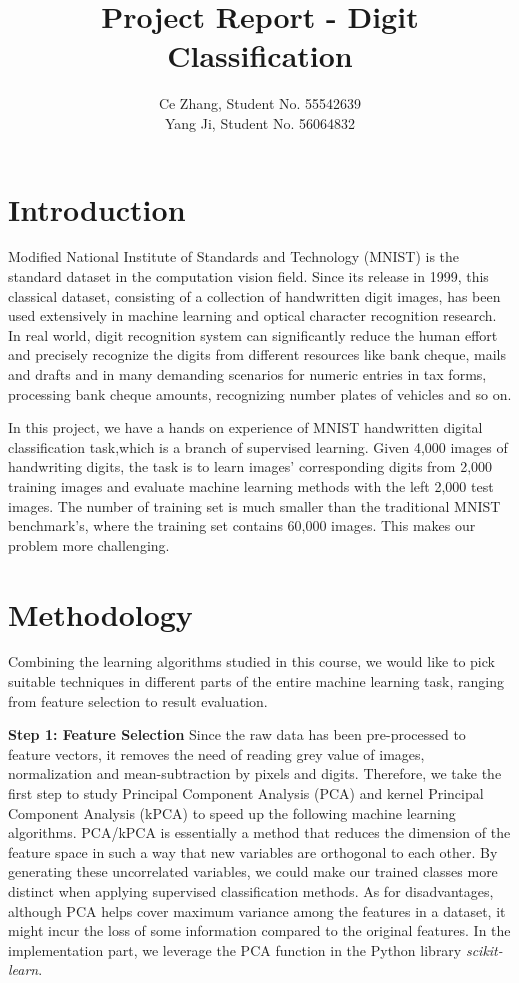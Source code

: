 \documentclass[12pt]{article}
\title{Project Report - Digit Classification}
\date{}
\author{\fontsize{12}{12}\selectfont Ce Zhang, Student No. 55542639\\
\fontsize{12}{12}\selectfont Yang Ji, Student No. 56064832}
\begin{document}
\maketitle
\section{\fontsize{12}{12}\selectfont Introduction}
Modified National Institute of Standards and Technology (MNIST) is the standard dataset in the computation vision field. Since its release in 1999, this classical dataset, consisting of a collection of handwritten digit images, has been used extensively in machine learning and optical character recognition research. In real world, digit recognition system can significantly reduce the human effort and precisely recognize the digits from different resources like bank cheque, mails and drafts and in many demanding scenarios for numeric entries in tax forms, processing bank cheque amounts, recognizing number plates of vehicles and so on. 

In this project, we have a hands on experience of MNIST handwritten digital classification task,which is a branch of supervised learning. Given 4,000 images of handwriting digits, the task is to learn images' corresponding digits from 2,000 training images and evaluate machine learning methods with the left 2,000 test images. The number of training set is much smaller than the traditional MNIST benchmark's, where the training set contains 60,000 images. This makes our problem more challenging.

\section{\fontsize{12}{12}\selectfont Methodology}
Combining the learning algorithms studied in this course, we would like to pick suitable techniques in different parts of the entire machine learning task, ranging from feature selection to result evaluation.

\textbf{Step 1: Feature Selection} 
Since the raw data has been pre-processed to feature vectors, it removes the need of reading grey value of images, normalization and mean-subtraction by pixels and digits. Therefore, we take the first step to study Principal Component Analysis (PCA) and kernel Principal Component Analysis (kPCA) to speed up the following machine learning algorithms. PCA/kPCA is essentially a method that reduces the dimension of the feature space in such a way that new variables are orthogonal to each other. By generating these uncorrelated variables, we could make our trained classes more distinct when applying supervised classification methods. As for disadvantages, although PCA helps cover maximum variance among the features in a dataset, it might incur the loss of some information compared to the original features. In the implementation part, we leverage the PCA function in the Python library \textit{scikit-learn}.
\end{document}
